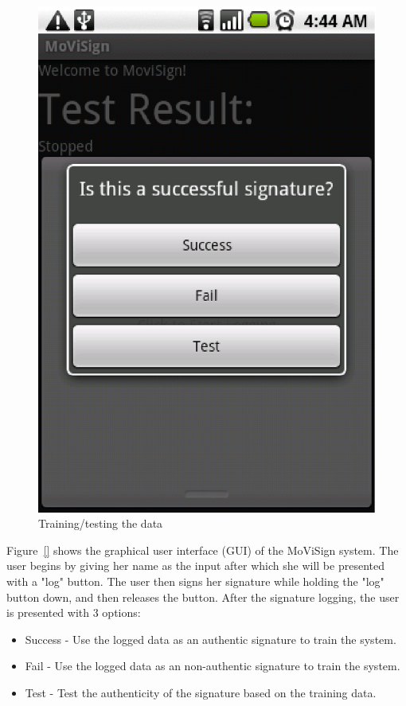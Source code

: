 \documentclass[12pt]{article}
\begin{document}
\begin{figure}[ht]
\begin{minipage}[b]{0.3\textwidth}
\includegraphics[width=\textwidth]{checkbox}
\caption{Training/testing the data}
\label{fig:checkbox}
\end{minipage}
\end{figure}

Figure~\ref{} shows the graphical user interface (GUI) of the MoViSign system. The user begins by giving her name as the input after which she will be presented with a "log" button. The user then signs her signature while holding the "log" button down, and then releases the button. After the signature logging, the user is presented with 3 options:
\begin{itemize}
\item Success - Use the logged data as an authentic signature to train the system.
\item Fail - Use the logged data as an non-authentic signature to train the system.
\item Test - Test the authenticity of the signature based on the training data.
\end{itemize}
\end{document}
